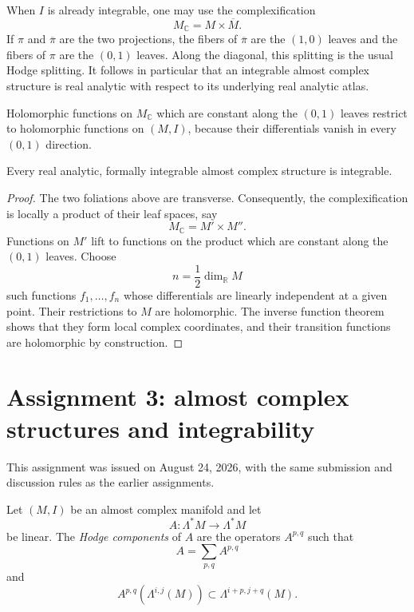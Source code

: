 When $I$ is already integrable, one may use
the complexification
$$
M_{\mathbb{C}}=M\times\overline{M}.
$$
If $\pi$ and $\overline{\pi}$ are the two
projections, the fibers of
$\overline{\pi}$ are the $(1,0)$ leaves and
the fibers of $\pi$ are the $(0,1)$ leaves.
Along the diagonal, this splitting is the
usual Hodge splitting. It follows in
particular that an integrable almost complex
structure is real analytic with respect to
its underlying real analytic atlas.

Holomorphic functions on
$M_{\mathbb{C}}$ which are constant along
the $(0,1)$ leaves restrict to holomorphic
functions on $(M,I)$, because their
differentials vanish in every $(0,1)$
direction.

\begin{theorem}
\label{theorem-real-analytic-newlander}
Every real analytic, formally integrable
almost complex structure is integrable.
\end{theorem}

\begin{proof}
The two foliations above are transverse.
Consequently, the complexification is
locally a product of their leaf spaces,
say
$$
M_{\mathbb{C}}=M'\times M''.
$$
Functions on $M'$ lift to functions on the
product which are constant along the
$(0,1)$ leaves. Choose
$$
n=\frac{1}{2}\dim_{\mathbb{R}}M
$$
such functions $f_1,\ldots,f_n$ whose
differentials are linearly independent at a
given point. Their restrictions to $M$ are
holomorphic. The inverse function theorem
shows that they form local complex
coordinates, and their transition functions
are holomorphic by construction.
\end{proof}

\section{Assignment 3: almost complex
structures and integrability}
\label{section-assignment-three-integrable}

\noindent
This assignment was issued on August 24,
2026, with the same submission and
discussion rules as the earlier assignments.

\begin{definition}
\label{definition-hodge-component-operator}
Let $(M,I)$ be an almost complex manifold
and let
$$
A:\Lambda^*M\longrightarrow\Lambda^*M
$$
be linear. The {\it Hodge components} of
$A$ are the operators $A^{p,q}$ such that
$$
A=\sum_{p,q}A^{p,q}
$$
and
$$
A^{p,q}(\Lambda^{i,j}(M))
\subset\Lambda^{i+p,j+q}(M).
$$
\end{definition}

